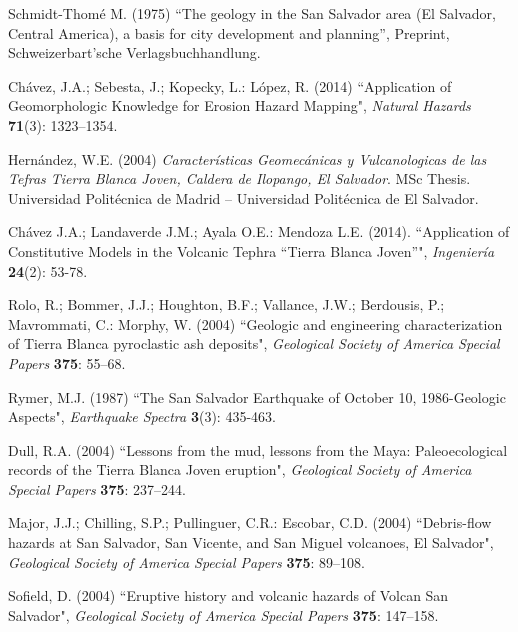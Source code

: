 \documentclass[11pt,twoside]{rmta2010eng}%
\begin{document}
\begin{thebibliography}{99}
Schmidt-Thom\'{e} M. (1975)
``The geology in the San Salvador area (El Salvador, Central America), a basis for city development and planning'',
Preprint,  Schweizerbart'sche Verlagsbuchhandlung.




Ch\'{a}vez, J.A.; Sebesta, J.; Kopecky, L.: L\'{o}pez, R. (2014)
``Application of Geomorphologic Knowledge for Erosion Hazard Mapping", 
{\it Natural Hazards} {\bf 71}(3): 1323–1354.



Hern\'{a}ndez, W.E. (2004)
{\it Caracter\'{i}sticas Geomec\'{a}nicas y Vulcanologicas de las Tefras Tierra Blanca Joven, Caldera de Ilopango, El Salvador}.
MSc Thesis. Universidad Polit\'{e}cnica de Madrid – Universidad Polit\'{e}cnica de El Salvador.



Ch\'{a}vez J.A.; Landaverde J.M.; Ayala O.E.: Mendoza L.E. (2014). 
``Application of Constitutive Models in the Volcanic Tephra ``Tierra Blanca Joven''", 
{\it Ingenier\'{i}a} {\bf 24}(2): 53-78.





Rolo, R.; Bommer, J.J.; Houghton, B.F.; Vallance, J.W.; Berdousis, P.; Mavrommati, C.: Morphy, W. (2004)
``Geologic and engineering characterization of Tierra Blanca pyroclastic ash deposits", 
{\it Geological Society of America Special Papers} {\bf 375}: 55--68.



Rymer, M.J. (1987) 
``The San Salvador Earthquake of October 10, 1986-Geologic Aspects", 
{\it Earthquake Spectra} {\bf 3}(3): 435-463.




Dull, R.A. (2004)
``Lessons from the mud, lessons from the Maya: Paleoecological records of the Tierra Blanca Joven eruption", 
{\it Geological Society of America Special Papers} {\bf 375}: 237--244.




Major, J.J.; Chilling, S.P.; Pullinguer, C.R.: Escobar, C.D. (2004)
``Debris-flow hazards at San Salvador, San Vicente, and San Miguel volcanoes, El Salvador", 
{\it Geological Society of America Special Papers} {\bf 375}: 89--108.





Sofield, D. (2004)
``Eruptive history and volcanic hazards of Volcan San Salvador", 
{\it Geological Society of America Special Papers} {\bf 375}: 147--158.




\end{thebibliography}
\end{document}
